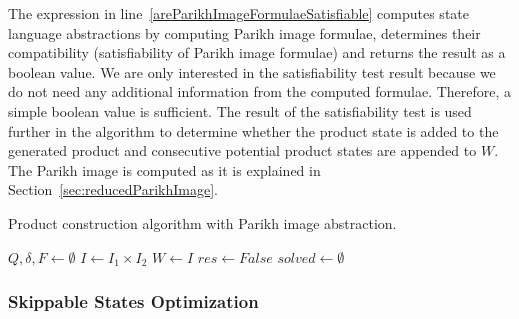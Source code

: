 The expression in line~\ref{areParikhImageFormulaeSatisfiable} computes state language abstractions by computing Parikh image formulae, determines their compatibility (satisfiability of Parikh image formulae) and returns the result as a boolean value. We are only interested in the satisfiability test result because we do not need any additional information from the computed formulae. Therefore, a simple boolean value is sufficient. The result of the satisfiability test is used further in the algorithm to determine whether the product state is added to the generated product and consecutive potential product states are appended to $W$. The Parikh image is computed as it is explained in Section~\ref{sec:reducedParikhImage}.

\begin{algorithm}
\caption{Product construction algorithm with Parikh image abstraction.}\label{productConstructionParikhImageAlgorithm}
\DontPrintSemicolon
{}
\BlankLine
$Q, \delta, F \gets \emptyset$ \;
$I \gets I_1 \times I_2$ \;
$W \gets I$ \;
$res \gets False$ \;
$solved \gets \emptyset$ \;\label{PIAlgorithm:solved}
\end{algorithm}

\subsubsection{Skippable States Optimization}

